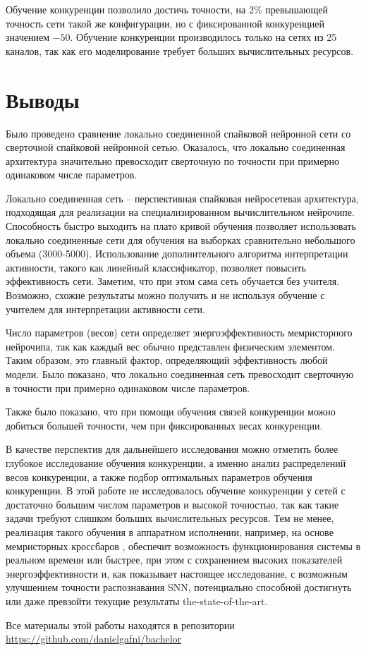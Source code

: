 \documentclass[a4paper]{article}
\begin{document}
Обучение конкуренции позволило достичь точности, на 2\% превышающей точность сети такой же конфигурации, но с фиксированной конкуренцией значением $-50$. Обучение конкуренции производилось только на сетях из 25 каналов, так как его моделирование требует больших вычислительных ресурсов.


\section*{Выводы}
Было проведено сравнение локально соединенной спайковой нейронной сети со сверточной спайковой нейронной сетью. Оказалось, что локально соединенная архитектура значительно превосходит сверточную по точности при примерно одинаковом числе параметров.

Локально соединенная сеть – перспективная спайковая нейросетевая архитектура, подходящая для реализации на специализированном вычислительном нейрочипе. Способность быстро выходить на плато кривой обучения позволяет использовать локально соединенные сети для обучения на выборках сравнительно небольшого объема (3000-5000). Использование дополнительного алгоритма интерпретации активности, такого как линейный классификатор, позволяет повысить эффективность сети. Заметим, что при этом сама сеть обучается без учителя. Возможно, схожие результаты можно получить и не используя обучение с учителем для интерпретации активности сети.

Число параметров (весов) сети определяет энергоэффективность мемристорного нейрочипа, так как каждый вес обычно представлен физическим элементом. Таким образом, это главный фактор, определяющий эффективность любой модели. Было показано, что локально соединенная сеть превосходит сверточную в точности при примерно одинаковом числе параметров.

Также было показано, что при помощи обучения связей конкуренции можно добиться большей точности, чем при фиксированных весах конкуренции.

В качестве перспектив для дальнейшего исследования можно отметить более глубокое исследование обучения конкуренции, а именно анализ распределений весов конкуренции, а также подбор оптимальных параметров обучения конкуренции. В этой работе не исследовалось обучение конкуренции у сетей с достаточно большим числом параметров и высокой точностью, так как такие задачи требуют слишком больших вычислительных ресурсов. Тем не менее, реализация такого обучения в аппаратном исполнении, например, на основе мемристорных кроссбаров \cite{Li_2018}, обеспечит возможность функционирования системы в реальном времени или быстрее, при этом с сохранением высоких показателей энергоэффективности и, как показывает настоящее исследование, с возможным улучшением точности распознавания SNN, потенциально способной достигнуть или даже превзойти текущие результаты the-state-of-the-art.

\clearpage 

\printbibliography[sorting=none,heading=bibintoc,type=article,title={Литература}]
 
\begin{center}
Все материалы этой работы находятся в репозитории\\
\href{https://github.com/danielgafni/bachelor}{https://github.com/danielgafni/bachelor} 
\end{center}
\end{document}
